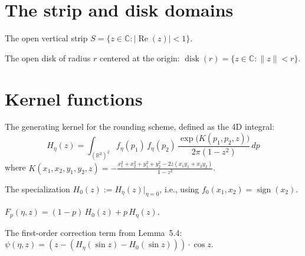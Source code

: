 \section{The strip and disk domains}

\begin{definition}[Strip $S$]
  \label{def:strip}
  \leanok
  The open vertical strip $S = \{z \in \mathbb{C} : |\operatorname{Re}(z)| < 1\}$.
\end{definition}

\begin{definition}[Disk]
  \label{def:disk}
  \leanok
  The open disk of radius $r$ centered at the origin:
  $\operatorname{disk}(r) = \{z \in \mathbb{C} : \|z\| < r\}$.
\end{definition}

\section{Kernel functions}

\begin{definition}
  \label{def:H_eta}
  \leanok
  The generating kernel for the rounding scheme, defined as the 4D integral:
  \[
    H_\eta(z) = \int_{(\mathbb{R}^2)^2}
    f_\eta(p_1)\, f_\eta(p_2)\,
    \frac{\exp\!\bigl(K(p_1, p_2, z)\bigr)}{2\pi(1-z^2)}
    \,dp
  \]
  where $K(x_1,x_2,y_1,y_2,z) = -\frac{x_1^2 + x_2^2 + y_1^2 + y_2^2 - 2z(x_1 y_1 + x_2 y_2)}{1-z^2}$.
\end{definition}

\begin{definition}[Kernel $H_0$]
  \label{def:H0}
  \leanok
  The specialization $H_0(z) := H_\eta(z)|_{\eta=0}$, i.e., using $f_0(x_1,x_2) = \operatorname{sign}(x_2)$.
\end{definition}

\begin{definition}
  \label{def:F_p}
  \leanok
  $F_p(\eta, z) = (1-p)\,H_0(z) + p\,H_\eta(z)$.
\end{definition}

\begin{definition}
  \label{def:psi}
  \leanok
  The first-order correction term from Lemma~5.4:
  $\psi(\eta, z) = (z - (H_\eta(\sin z) - H_0(\sin z))) \cdot \cos z$.
\end{definition}

